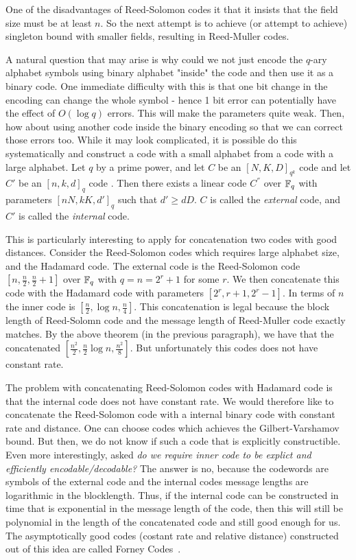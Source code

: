 One of the disadvantages of Reed-Solomon codes it that it insists that the field size must be at least $n$. So the next attempt is to achieve (or attempt to achieve) singleton bound with smaller fields, resulting in Reed-Muller codes.


\begin{curiousity}
A natural question that may arise is why could we not just encode the $q$-ary alphabet symbols using binary alphabet "inside" the code and then use it as a binary code. One immediate difficulty with this is that one bit change in the encoding can change the whole symbol - hence 1 bit error can potentially have the effect of $O(\log q)$ errors. This will make the parameters quite weak. Then, how about using another code inside the binary encoding so that we can correct those errors too. While it may look complicated, it is possible do this systematically and construct a code with a small alphabet from a code with a large alphabet.
Let $q$ by a prime power, and let $C$ be an $[N,K,D]_{q^k}$ code and let $C'$ be an $[n,k,d]_q$ code . Then there exists a linear code $C^{''}$ over ${\mathbb{F}}_q$ with parameters $[nN,kK,d']_q$ such that $d' \ge dD$. $C$ is called the {\em external} code, and $C'$ is called the {\em internal} code.

This is particularly interesting to apply for concatenation two codes with good distances. Consider the Reed-Solomon codes which requires large alphabet size, and the Hadamard code. The external code is the Reed-Solomon code $[n,\frac{n}{2},\frac{n}{2}+1]$ over ${\mathbb{F}}_q$ with $q=n=2^r+1$ for some $r$. We then concatenate this code with the Hadamard code with parameters $[2^r,r+1,2^r-1]$. In terms of $n$ the inner code is $[\frac{n}{2},\log n,\frac{n}{4}]$. This concatenation is legal because the block length of Reed-Solomn code and the message length of Reed-Muller code exactly matches. By the above theorem (in the previous paragraph), we have that the concatenated $[\frac{n^2}{2},\frac{n}{2}\log n,\frac{n^2}{8}]$. But unfortunately this codes does not have constant rate.

The problem with concatenating Reed-Solomon codes with Hadamard code is that the internal code does not have constant rate. We would therefore like to concatenate the Reed-Solomon code with a internal binary code with constant rate and distance. One can choose codes which achieves the Gilbert-Varshamov bound. But then, we do not know if such a code that is explicitly constructible. Even more interestingly, \cite{For66} asked \textit{do we require inner code to be explict and efficiently encodable/decodable?} The answer is no, because the codewords are symbols of the external code and the internal codes message lengths are logarithmic in the blocklength. Thus, if the internal code can be constructed in time that is exponential in the message length of the code, then this will still be polynomial in the length of the concatenated code and still good enough for us. The asymptotically good codes (costant rate and relative distance) constructed out of this idea are called Forney Codes~\cite{For66}.
\end{curiousity}


